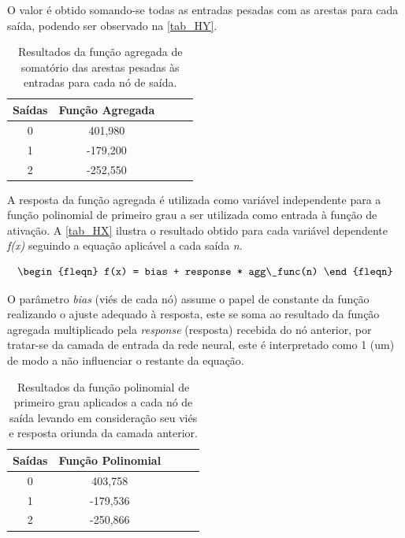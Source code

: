 O valor é obtido somando-se todas as entradas pesadas com as arestas para cada saída, podendo ser observado na \autoref{tab_HY}.

\begin{table}[htb]
	\centering
    \caption{\label{tab_HY}Resultados da função agregada de somatório das arestas pesadas às entradas para cada nó de saída.}
    \begin{tabular}{ccccc}
        \hline
		\textbf{Sa\'{i}das} & \textbf{Fun\c{c}\~{a}o Agregada} \\ \hline
		0 & 401,980    \\ \hline
		1 & -179,200    \\ \hline
		2 & -252,550  \\ \hline
    \end{tabular}
    
\end{table}

A resposta da função agregada é utilizada como variável independente para a função polinomial de primeiro grau a ser utilizada
como entrada à função de ativação. A \autoref{tab_HX} ilustra o resultado obtido para cada variável dependente \textit{f(x)}
seguindo a equação aplicável a cada saída \textit{n}.

\begin{equation}
\begin{fleqn}
f(x) = bias + response * agg\_func(n)
\end{fleqn}
\end{equation}

O parâmetro \textit{bias} (viés de cada nó) assume o papel de constante da função realizando o ajuste adequado à resposta,
este se soma ao resultado da função agregada multiplicado pela \textit{response} (resposta) recebida do nó anterior,
por tratar-se da camada de entrada da rede neural, este é interpretado como 1 (um) de modo a não influenciar o restante da equação.

\begin{table}[htb]
	\centering
    \caption{\label{tab_HX}Resultados da função polinomial de primeiro grau aplicados a cada nó de saída levando em consideração seu viés e resposta oriunda da camada anterior.}
    \begin{tabular}{ccccc}
        \hline
		\textbf{Sa\'{i}das} & \textbf{Fun\c{c}\~{a}o Polinomial} \\ \hline
		0 & 403,758    \\ \hline
		1 & -179,536    \\ \hline
		2 & -250,866  \\ \hline
    \end{tabular}
    
\end{table}

